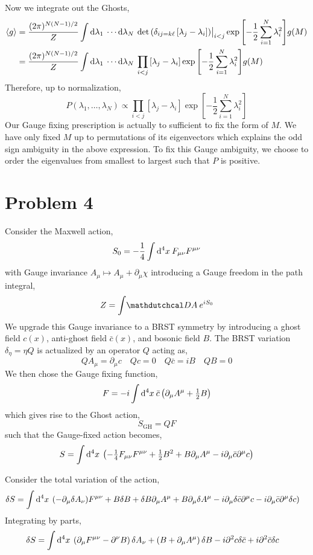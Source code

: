 \documentclass[12pt]{article}
\begin{document}
Now we integrate out the Ghosts,
\begin{align*}
\left< g \right> & = \frac{(2 \pi)^{N(N-1)/2}}{Z} \int \mathrm{d}\lambda_1 \: \cdots \mathrm{d}\lambda_N \: \det{\left(\delta_{ij = k \ell} \left[ \lambda_j - \lambda_i \right]\right)} \big|_{i < j} \exp{\left[ -\frac{1}{2} \sum_{i = 1}^N \lambda_i^2 \right] } g(M)
\\
& = \frac{(2 \pi)^{N(N-1)/2}}{Z} \int \mathrm{d}\lambda_1 \: \cdots \mathrm{d}\lambda_N \: \prod_{i < j} \left[ \lambda_j - \lambda_i \right] \exp{\left[ -\frac{1}{2} \sum_{i = 1}^N \lambda_i^2 \right] } g(M)
\end{align*}
Therefore, up to normalization,
\[ P(\lambda_1, \dots, \lambda_N) \propto \prod_{i < j} \left[ \lambda_j - \lambda_i \right] \exp{\left[ -\frac{1}{2} \sum_{i = 1}^N \lambda_i^2 \right] } \]
Our Gauge fixing prescription is actually to sufficient to fix the form of $M$. We have only fixed $M$ up to permutations of its eigenvectors which explains the odd sign ambiguity in the above expression. To fix this Gauge ambiguity, we choose to order the eigenvalues from smallest to largest such that $P$ is positive. 

\section*{Problem 4}

Consider the Maxwell action,
\[ S_0 = - \frac{1}{4} \int \mathrm{d}^{4} x \: F_{\mu\nu} F^{\mu\nu} \]
with Gauge invariance $A_\mu \mapsto A_\mu + \partial_\mu \chi$ introducing a Gauge freedom in the path integral,
\[ Z = \int \pathd{A} e^{i S_0} \] 
We upgrade this Gauge invariance to a BRST symmetry by introducing a ghost field $c(x)$, anti-ghost field $\bar{c}(x)$, and bosonic field $B$. The BRST variation $\delta_{\eta} = \eta Q$ is actualized by an operator $Q$ acting as,
\[ Q A_\mu = \partial_\mu c \quad Qc = 0 \quad Q \bar{c} = i B \quad QB = 0 \]
We then chose the Gauge fixing function,
\[ F = - i \int \mathrm{d}^{4} x \: \bar{c} \left( \partial_\mu A^\mu + \tfrac{1}{2} B \right) \]
which gives rise to the Ghost action,
\[ S_{\text{GH}} = QF \]
such that the Gauge-fixed action becomes,
\[ S = \int \mathrm{d}^{4} x \: \left( - \tfrac{1}{4} F_{\mu\nu} F^{\mu\nu} + \tfrac{1}{2} B^2 + B \partial_\mu A^{\mu} - i \partial_\mu \bar{c} \partial^\mu c \right) \]

Consider the total variation of the action,
\begin{align*}
\delta S & = \int \mathrm{d}^{4} x \: \left( -\partial_\mu \delta A_\nu ) F^{\mu\nu} + B \delta B + \delta B \partial_\mu A^{\mu} + B \partial_\mu \delta A^{\mu} - i \partial_\mu \delta \bar{c} \partial^\mu c - i \partial_\mu \bar{c} \partial^\mu \delta c \right) 
\end{align*}
Integrating by parts,
\begin{align*}
\delta S & = \int \mathrm{d}^{4} x \: \left( \partial_\mu F^{\mu \nu} - \partial^\nu B \right) \delta A_\nu + \left( B + \partial_\mu A^\mu \right) \delta B - i \partial^2 c \delta \bar{c} + i \partial^2 \bar{c} \delta c
\end{align*}
\end{document}
